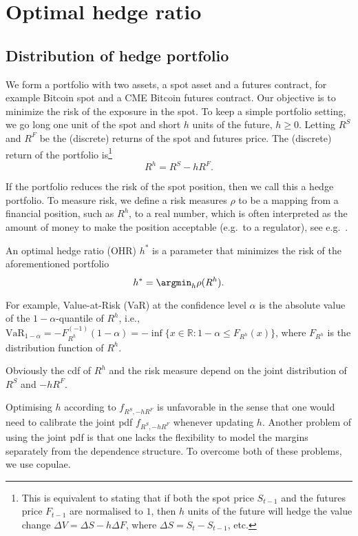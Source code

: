 \section{Optimal hedge ratio}\label{sec:optimal-hedge-ratio}

\subsection{Distribution of hedge portfolio}\label{subsec:DHP}
We form a portfolio with two assets, a spot asset and a futures
contract, for example Bitcoin spot and a CME Bitcoin futures contract.
Our objective is to minimize the risk of the exposure in the spot.
To keep a simple portfolio setting, we go long one unit of the spot
and short $h$ units of the future, $h \geq 0$.
Letting $R^S$ and $R^F$ be the (discrete) returns of the spot and
futures price. The (discrete) return of the portfolio is\footnote{%
This is equivalent to stating that if both the spot price $S_{t-1}$
and the futures price $F_{t-1}$ are 
normalised to $1$, then $h$ units of the future will hedge the value
change $\Delta V = \Delta S - h \Delta F$, where $\Delta S =
S_t-S_{t-1}$, etc.
  }
\begin{equation*}
R^h = R^S -h R^F.
\end{equation*}


If the portfolio reduces the risk of the spot position, then
we call this a hedge portfolio.
To measure risk, we define a risk measures $\rho$ to be a mapping from
a financial position, such as $R^h$, to a real number, which is often
interpreted as the amount of money to make the position acceptable
(e.g.\ to a regulator), see e.g.\ \citep{Foellmer2002}. \medskip

An optimal hedge ratio (OHR) $h^*$ is a parameter that
minimizes the risk of the aforementioned portfolio
\begin{equation*}
h^* = \argmin_h \rho(R^h).
\end{equation*}

For example, Value-at-Risk (VaR) at the confidence level $\alpha$ is
the absolute value of the $1-\alpha$-quantile of $R^h$, i.e., $\text{VaR}_{1-\alpha} =
-F_{R^h}^{(-1)}(1-\alpha) = -\inf\{x \in \mathbb{R}: 1-\alpha \leq
F_{R^h}(x) \}$, where $F_{R^h}$ is the distribution function of
$R^h$. \medskip

Obviously the cdf of $R^h$ and the risk measure depend on the joint distribution of $R^S$ and $-hR^F$. \medskip

Optimising $h$ according to $f_{R^S,-hR^F}$ is unfavorable in the
sense that one would need to calibrate the joint pdf $f_{R^S,-hR^F}$
whenever updating $h$.
Another problem of using the joint pdf is that one lacks the
flexibility to model the margins separately from the dependence structure.
To overcome both of these problems, we use copulae. \medskip

